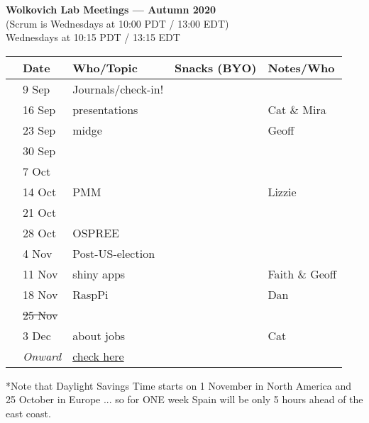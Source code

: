 \documentclass[11pt]{article}
\begin{document}
 
\raggedright
{}

\begin{center} 
{\large \textbf{Wolkovich Lab Meetings --- Autumn 2020}} \\ [2pt]
(Scrum is Wednesdays at 10:00 PDT / 13:00 EDT)\\
Wednesdays at 10:15 PDT / 13:15 EDT \\
\end{center} 

\begin{center}
\begin{tabular}{ p{0.2 cm}  p{2 cm}  p{5 cm}  p{2 cm}  p{4 cm} }  \hline \hline
 & \textbf{Date}
   & \textbf{Who/Topic}
      & \textbf{Snacks (BYO)} 
         & \textbf{Notes/Who} \\ 
\hline \hline
 & 9 Sep & Journals/check-in! &       &  \\\hline
 & 16 Sep & presentations &  & Cat \& Mira\\\hline
 & 23 Sep & midge &      & Geoff \\\hline  
 & 30 Sep &  &       &   \\\hline
 & 7 Oct &  &       &   \\\hline
 & 14 Oct & PMM  &       &  Lizzie \\\hline
 & 21 Oct &  &       &   \\\hline
 & 28 Oct & OSPREE &       &  \\\hline
 & 4 Nov &  Post-US-election &       &   \\\hline
 & 11 Nov &  shiny apps &       & Faith \& Geoff \\\hline
 & 18 Nov & RaspPi &       &  Dan \\\hline
 & \sout{25 Nov} &  &       &   \\\hline
 & 3 Dec & about jobs  &       & Cat  \\\hline
 & \emph{Onward} & \href{https://github.com/temporalecologylab/labgit/wiki/Current-lab-meeting-schedule}{check here}&    & \\\hline

\hline
\end{tabular}
\end{center}
*Note that Daylight Savings Time starts on 1 November in North America and 25 October in Europe ... so for ONE week Spain will be only 5 hours ahead of the east coast.\\
\end{document}
